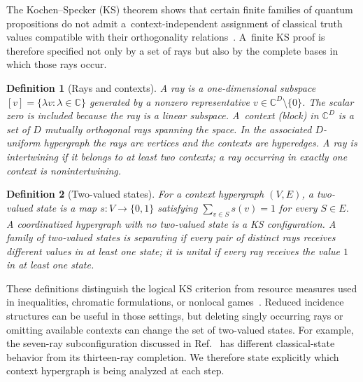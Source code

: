 \documentclass[%
  reprint,
  superscriptaddress,
  showpacs,
  showkeys,
  amsmath,amssymb,
  pra,
  longbibliography,
  floatfix,
  x11names
]{revtex4-2}
\newenvironment{revision}{\begingroup}{\endgroup}
\newtheorem{definition}{Definition}
\begin{document}
\begin{revision}
The Kochen--Specker (KS) theorem shows that certain finite families of quantum propositions do not admit a~context-independent assignment of classical truth values compatible with their orthogonality relations~\cite{kochen1}.  A~finite KS proof is therefore specified not only by a set of rays but also by the complete bases in which those rays occur.

\begin{definition}[Rays and contexts]
\label{def:contexts}
A \emph{ray} is a one-dimensional subspace
$[v]=\{\lambda v:\lambda\in\mathbb{C}\}$ generated by a
nonzero representative \ensuremath{v\in\mathbb{C}^D\setminus\{0\}}.
The scalar zero is included because the ray is a linear subspace.
A~\emph{context} (block) in $\mathbb{C}^D$ is a set of $D$ mutually orthogonal rays spanning the space.  In the associated $D$-uniform hypergraph the rays are vertices and the contexts are hyperedges.  A ray is \emph{intertwining} if it belongs to at least two contexts; a ray occurring in exactly one context is nonintertwining.
\end{definition}

\begin{definition}[Two-valued states]
\label{def:states}
For a context hypergraph $(V,E)$, a two-valued state is a map $s:V\to\{0,1\}$ satisfying $\sum_{v\in S}s(v)=1$ for every \ensuremath{S\in E}.
A coordinatized hypergraph with no two-valued state is a KS configuration.  A family of two-valued states is \emph{separating} if every pair of distinct rays receives different values in at least one state; it is \emph{unital} if every ray receives the value $1$ in at least one state.
\end{definition}

These definitions distinguish the logical KS criterion from resource measures used in inequalities, chromatic formulations, or nonlocal games~\cite{cabello:210401,2024-cabello-trandafir0,svozil-2025-color}.  Reduced incidence structures can be useful in those settings, but deleting singly occurring rays or omitting available contexts can change the set of two-valued states.  For example, the seven-ray subconfiguration discussed in Ref.~\cite[Fig.~6(a)]{pavicic-2025} has different classical-state behavior from its thirteen-ray completion.  We therefore state explicitly which context hypergraph is being analyzed at each step.


\end{revision}
\end{document}
